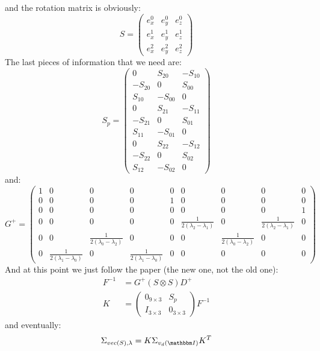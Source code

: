 \documentclass[a4paper,11pt]{article}
\newcommand{\itm}{\mathbbm I}
\begin{document}
and the rotation matrix is obviously:
\begin{equation}
  S =
  \begin{pmatrix}
    e^0_x & e^0_y & e^0_z\\
    e^1_x & e^1_y & e^1_z\\
    e^2_x & e^2_y & e^2_z
  \end{pmatrix}
\end{equation}
The last pieces of information that we need are:
\begin{equation}
  S_p =
  \begin{pmatrix}
    0 & S_{20} & -S_{10}\\
    -S_{20} & 0 & S_{00}\\
    S_{10} & -S_{00} & 0\\
    0 & S_{21} & -S_{11}\\
    -S_{21} & 0 & S_{01}\\
    S_{11} & -S_{01} & 0\\
    0 & S_{22} & -S_{12}\\
    -S_{22} & 0 & S_{02}\\
    S_{12} & -S_{02} & 0
  \end{pmatrix}
\end{equation}
and:
\begin{equation}
  G^+ =
  \begin{pmatrix}
    1 & 0  & 0  & 0  & 0 & 0  & 0  & 0  & 0\\
    0 & 0  & 0  & 0  & 1 & 0  & 0  & 0  & 0\\
    0 & 0  & 0  & 0  & 0 & 0  & 0  & 0  & 1\\
    0 & 0  & 0  & 0  & 0 & \frac{1}{2(\lambda_2 - \lambda_1)} &
    0  & \frac{1}{2(\lambda_2 - \lambda_1)} & 0\\
    0 & 0  & \frac{1}{2(\lambda_0 - \lambda_2)} &
    0  & 0 & 0  & \frac{1}{2(\lambda_0 - \lambda_2)} & 0  & 0\\
    0 & \frac{1}{2(\lambda_1 - \lambda_0)} & 0 &
    \frac{1}{2(\lambda_1 - \lambda_0)} & 0 & 0  & 0  & 0  & 0
  \end{pmatrix}
\end{equation}
And at this point we just follow the paper (the new one, not the old one):
\begin{align}
  F^{-1} &= G^+ (S \otimes S) D^+\\
  K &=
  \begin{pmatrix}
    0_{9\times3} & S_p\\
    I_{3\times3} & 0_{3\times3}
  \end{pmatrix}
  F^{-1}
\end{align}
and eventually:
\begin{equation}
  \Sigma_{vec(S), \lambda} = K \Sigma_{v_d(\itm)} K^T
\end{equation}
\end{document}
